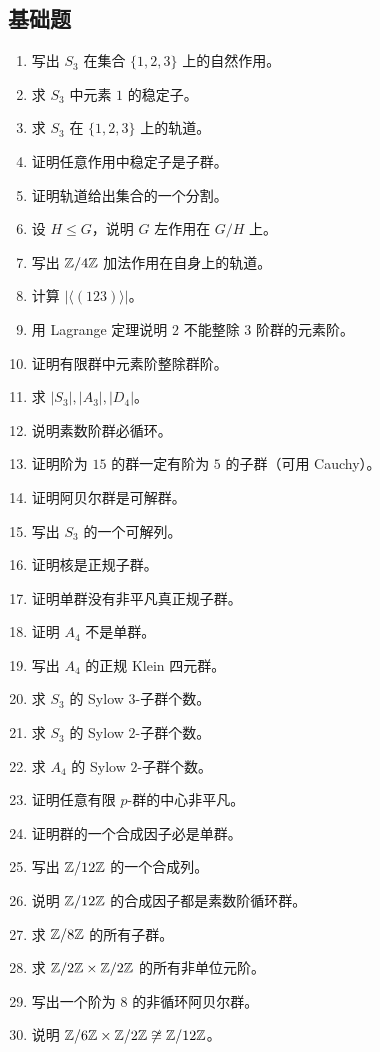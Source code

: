 \subsection*{基础题}
\begin{enumerate}[label=\textbf{\arabic*.}, leftmargin=*, itemsep=0.5em]
\item \basic 写出 $S_3$ 在集合 $\{1,2,3\}$ 上的自然作用。
\item \basic 求 $S_3$ 中元素 $1$ 的稳定子。
\item \basic 求 $S_3$ 在 $\{1,2,3\}$ 上的轨道。
\item \basic 证明任意作用中稳定子是子群。
\item \basic 证明轨道给出集合的一个分割。
\item \basic 设 $H\le G$，说明 $G$ 左作用在 $G/H$ 上。
\item \basic 写出 $\mathbb{Z}/4\mathbb{Z}$ 加法作用在自身上的轨道。
\item \basic 计算 $|\langle(123)\rangle|$。
\item \basic 用 Lagrange 定理说明 $2$ 不能整除 $3$ 阶群的元素阶。
\item \basic 证明有限群中元素阶整除群阶。
\item \basic 求 $|S_3|,|A_3|,|D_4|$。
\item \basic 说明素数阶群必循环。
\item \basic 证明阶为 $15$ 的群一定有阶为 $5$ 的子群（可用 Cauchy）。
\item \basic 证明阿贝尔群是可解群。
\item \basic 写出 $S_3$ 的一个可解列。
\item \basic 证明核是正规子群。
\item \basic 证明单群没有非平凡真正规子群。
\item \basic 证明 $A_4$ 不是单群。
\item \basic 写出 $A_4$ 的正规 Klein 四元群。
\item \basic 求 $S_3$ 的 Sylow $3$-子群个数。
\item \basic 求 $S_3$ 的 Sylow $2$-子群个数。
\item \basic 求 $A_4$ 的 Sylow $2$-子群个数。
\item \basic 证明任意有限 $p$-群的中心非平凡。
\item \basic 证明群的一个合成因子必是单群。
\item \basic 写出 $\mathbb{Z}/12\mathbb{Z}$ 的一个合成列。
\item \basic 说明 $\mathbb{Z}/12\mathbb{Z}$ 的合成因子都是素数阶循环群。
\item \basic 求 $\mathbb{Z}/8\mathbb{Z}$ 的所有子群。
\item \basic 求 $\mathbb{Z}/2\mathbb{Z}\times\mathbb{Z}/2\mathbb{Z}$ 的所有非单位元阶。
\item \basic 写出一个阶为 $8$ 的非循环阿贝尔群。
\item \basic 说明 $\mathbb{Z}/6\mathbb{Z}\times\mathbb{Z}/2\mathbb{Z}\not\cong \mathbb{Z}/12\mathbb{Z}$。
\end{enumerate}
